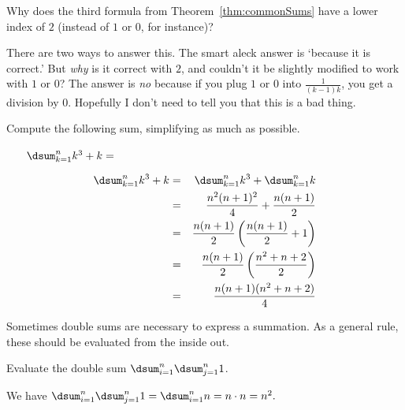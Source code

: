 \begin{ques}
Why does the third formula from Theorem~\ref{thm:commonSums} have a lower index of $2$ 
(instead of $1$ or $0$, for instance)?

\noindent
\answerlinetwo
\begin{answer}
There are two ways to answer this.  The smart aleck answer is `because it is correct.'
But {\em why} is it correct with $2$, and couldn't it be slightly modified to work with $1$ or $0$?
The answer is {\em no} because if you plug $1$ or $0$ into $\frac{1}{(k-1)k}$, 
you get a division by $0$.  Hopefully I don't need to tell you that this is a bad thing.
\end{answer}
\end{ques}

\begin{exer}
Compute the following sum, simplifying as much as possible.

\noindent
$\hspace*{.25in}\dsum _{k=1}^n k^3+k=$
\vspace*{3.5in}
\begin{answer}
\begin{eqnarray*}
\dsum _{k=1}^n k^3+k &=& \dsum _{k=1}^n k^3+ \dsum _{k=1}^n k\\
&=&\frac{n^2(n+1)^2}{4}+\frac{n(n+1)}{2}\\
&=&\frac{n(n+1)}{2}\left(\frac{n(n+1)}{2}+1\right)\\
&=&\frac{n(n+1)}{2}\left(\frac{n^2+n+2}{2}\right)\\
&=&\frac{n(n+1)(n^2+n+2)}{4}
\end{eqnarray*}
\end{answer}
\end{exer}

Sometimes double sums are necessary to express a summation.
As a general rule, these should be evaluated from the inside out.

\begin{exa}
Evaluate the double sum 
$\dsum _{i=1}^n \dsum _{j=1}^n 1$.
\begin{sol}
We have
$\dsum _{i=1}^n \dsum _{j=1}^n 1 = \dsum _{i=1}^n n =n\cdot n = n^2.$
\end{sol}
\end{exa}


